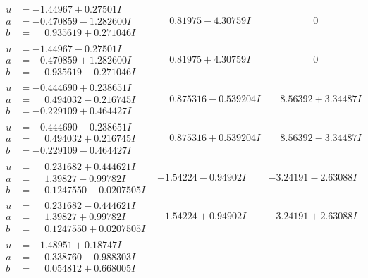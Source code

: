 \documentclass[1p]{elsarticle_modified}
\theoremstyle{definition}
\begin{document}
$$\begin{array}{c|c|c}
\begin{aligned}
u &= -1.44967 + 0.27501 I \\
a &= -0.470859 - 1.282600 I \\
b &= \phantom{-}0.935619 + 0.271046 I\end{aligned}
 & \phantom{-}0.81975 - 4.30759 I & \phantom{-0.000000 } 0 \\ \hline\begin{aligned}
u &= -1.44967 - 0.27501 I \\
a &= -0.470859 + 1.282600 I \\
b &= \phantom{-}0.935619 - 0.271046 I\end{aligned}
 & \phantom{-}0.81975 + 4.30759 I & \phantom{-0.000000 } 0 \\ \hline\begin{aligned}
u &= -0.444690 + 0.238651 I \\
a &= \phantom{-}0.494032 - 0.216745 I \\
b &= -0.229109 + 0.464427 I\end{aligned}
 & \phantom{-}0.875316 - 0.539204 I & \phantom{-}8.56392 + 3.34487 I \\ \hline\begin{aligned}
u &= -0.444690 - 0.238651 I \\
a &= \phantom{-}0.494032 + 0.216745 I \\
b &= -0.229109 - 0.464427 I\end{aligned}
 & \phantom{-}0.875316 + 0.539204 I & \phantom{-}8.56392 - 3.34487 I \\ \hline\begin{aligned}
u &= \phantom{-}0.231682 + 0.444621 I \\
a &= \phantom{-}1.39827 - 0.99782 I \\
b &= \phantom{-}0.1247550 - 0.0207505 I\end{aligned}
 & -1.54224 - 0.94902 I & -3.24191 - 2.63088 I \\ \hline\begin{aligned}
u &= \phantom{-}0.231682 - 0.444621 I \\
a &= \phantom{-}1.39827 + 0.99782 I \\
b &= \phantom{-}0.1247550 + 0.0207505 I\end{aligned}
 & -1.54224 + 0.94902 I & -3.24191 + 2.63088 I \\ \hline\begin{aligned}
u &= -1.48951 + 0.18747 I \\
a &= \phantom{-}0.338760 - 0.988303 I \\
b &= \phantom{-}0.054812 + 0.668005 I\end{aligned}

\end{array}$$
\end{document}
